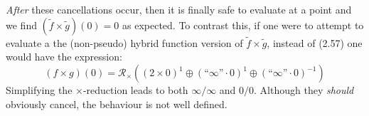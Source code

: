 \emph{After} these cancellations occur, then it is finally safe to evaluate at a point and 
we find $(\tilde{f} \times \tilde{g})(0)=0$ as expected.
To contrast this, if one were to attempt to evaluate a the (non-pseudo) hybrid function version of 
$\tilde{f} \times \tilde{g}$, instead of (2.57) one would have the expression:
\begin{equation}
	(f \times g)(0) = \mathcal{R}_\times \left( (2 \times 0)^1 \oplus (\text{``}\infty\text{''} \cdot 0)^1 \oplus (\text{``}\infty\text{''} \cdot 0)^{-1} \right)
\end{equation}
Simplifying the $\times$-reduction leads to both $\infty / \infty$ and $0/0$.
Although they \emph{should} obviously cancel, the behaviour is not well defined.














\newpage
